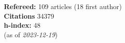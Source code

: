 \textbf{Refereed:} 109 articles (18 first author)\\\textbf{Citations} 34379\\\textbf{h-index:} 48\\(as of \textit{2023-12-19})